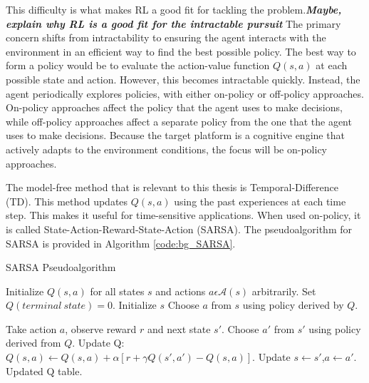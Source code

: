 	\par This difficulty is what makes RL a good fit for tackling the problem.\textbf{\textit{Maybe, explain why RL is a good fit for the intractable pursuit}} The primary concern shifts from intractability to ensuring the agent interacts with the environment in an efficient way to find the best possible policy. The best way to form a policy would be to evaluate the action-value function $Q(s,a)$ at each possible state and action. However, this becomes intractable quickly. Instead, the agent periodically explores policies, with either on-policy or off-policy approaches. On-policy approaches affect the policy that the agent uses to make decisions, while off-policy approaches affect a separate policy from the one that the agent uses to make decisions. Because the target platform is a cognitive engine that actively adapts to the environment conditions, the focus will be on-policy approaches. 
	\par The model-free method that is relevant to this thesis is Temporal-Difference (TD). This method updates $Q(s,a)$ using the past experiences at each time step. This makes it useful for time-sensitive applications. When used on-policy, it is called State-Action-Reward-State-Action (SARSA). The pseudoalgorithm for SARSA is provided in Algorithm \ref{code:bg_SARSA}.
	
	\begin{algorithm}[ht]
	\caption{SARSA Pseudoalgorithm}
	\label{code:bg_SARSA}
	\begin{algorithmic}[1]
		\State Initialize $Q(s,a)$ for all states $s$ and actions $a \epsilon \mathcal{A}(s)$ arbitrarily. Set $Q(terminal\ state)=0$.
		\State Initialize $s$
		\State Choose $a$ from $s$ using policy derived by $Q$.
		
		\State Take action $a$, observe reward $r$ and next state $s'$.
		\State Choose $a'$ from $s'$ using policy derived from $Q$.
		\State Update Q: $Q(s,a) \gets Q(s,a) + \alpha[r + \gamma Q(s',a')-Q(s,a)]$.
		\State Update $s \gets s'$,$a \gets a'$.
		\EndWhile
		\EndWhile
		\State \Return Updated Q table.
		\EndProcedure
	\end{algorithmic}
\end{algorithm}

